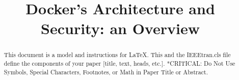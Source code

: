 \documentclass[conference]{IEEEtran}
\begin{document}
\title{Docker's Architecture and Security: an Overview}

\author{
}

\maketitle

\begin{abstract}
    This document is a model and instructions for \LaTeX.
    This and the IEEEtran.cls file define the components of your paper [title, text, heads, etc.]. *CRITICAL: Do Not Use Symbols, Special Characters, Footnotes,
    or Math in Paper Title or Abstract.
\end{abstract}










\end{document}

